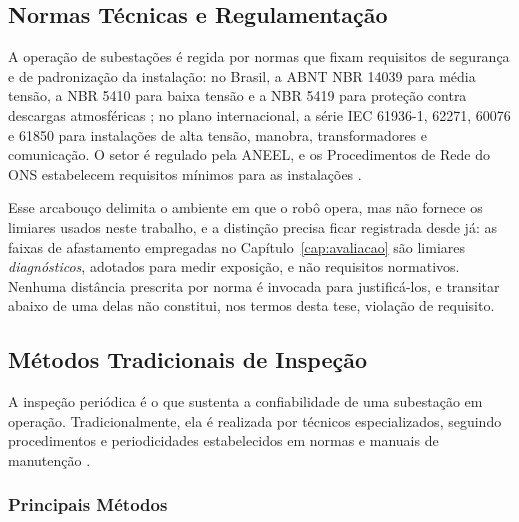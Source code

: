 \subsection{Normas Técnicas e Regulamentação}

A operação de subestações é regida por normas que fixam requisitos de segurança e de
padronização da instalação: no Brasil, a ABNT NBR 14039 para média tensão, a NBR 5410
para baixa tensão e a NBR 5419 para proteção contra descargas atmosféricas
\cite{ABNT2021}; no plano internacional, a série IEC 61936-1, 62271, 60076 e 61850 para
instalações de alta tensão, manobra, transformadores e comunicação. O setor é regulado
pela ANEEL, e os Procedimentos de Rede do ONS estabelecem requisitos mínimos para as
instalações \cite{ONS2020}.

Esse arcabouço delimita o ambiente em que o robô opera, mas não fornece os limiares
usados neste trabalho, e a distinção precisa ficar registrada desde já: as faixas de
afastamento empregadas no Capítulo~\ref{cap:avaliacao} são limiares \emph{diagnósticos},
adotados para medir exposição, e não requisitos normativos. Nenhuma distância prescrita
por norma é invocada para justificá-los, e transitar abaixo de uma delas não constitui,
nos termos desta tese, violação de requisito.

\subsection{Métodos Tradicionais de Inspeção}

A inspeção periódica é o que sustenta a confiabilidade de uma subestação em operação. Tradicionalmente, ela é realizada por técnicos especializados, seguindo procedimentos e periodicidades estabelecidos em normas e manuais de manutenção \cite{Silva2019}.

\subsubsection{Principais Métodos}

